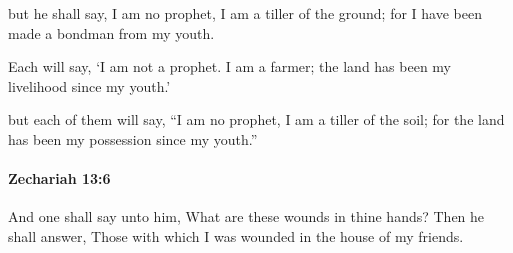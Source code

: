 			\begin{versebox}
					\item[BHS] 
					\item[LXX] 
					\item[ASV] but he shall say, I am no prophet, I am a tiller of the ground; for I have been made a bondman from my youth.
					\item[NIV] Each will say, ‘I am not a prophet. I am a farmer; the land has been my livelihood since my youth.’
					\item[NRSV] but each of them will say, “I am no prophet, I am a tiller of the soil; for the land has been my possession since my youth.”
			\end{versebox}

		\paragraph{Zechariah 13:6} %
			\label{ZECHARIAH-13-6}

			And one shall say unto him, What are these wounds in thine hands? Then he shall answer, Those with which I was wounded in the house of my friends.

